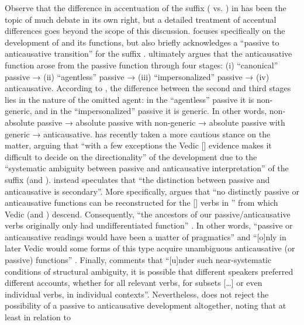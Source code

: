 Observe that the difference in accentuation of the suffix ( vs. ) in  has been the topic of much debate in its own right, but a detailed treatment of accentual differences goes beyond the scope of this discussion. \citet[246]{kulikov:2011b} focuses specifically on the development of  and its functions, but also briefly acknowledges a “passive to anticausative transition” for the suffix . \citet[248]{kulikov:2011b} ultimately argues that the anticausative function arose from the passive function through four stages: (i) “canonical” passive → (ii) “agentless” passive → (iii) “impersonalized” passive → (iv) anticausative. According to \citeauthor{kulikov:2011b}, the difference between the second and third stages lies in the nature of the omitted agent: in the “agentless” passive it is non-generic, and in the “impersonalized” passive it is generic. In other words, non-absolute passive → absolute passive with non-generic  → absolute passive with generic  → anticausative. \citet[182]{hock:2019} has recently taken a more cautious stance on the matter, arguing that “with a few exceptions the Vedic [] evidence makes it difficult to decide on the directionality” of the development due to the “systematic ambiguity between passive and anticausative interpretation” of the suffix  (and ). \citet[188]{hock:2019} instead speculates that “the distinction between passive and anticausative is secondary”. More specifically, \citet[188f.]{hock:2019} argues that “no distinctly passive or anticausative functions can be reconstructed for the [] verbs in ” from which Vedic   (and ) descend. Consequently, “the ancestors of our passive/anticausative verbs originally only had undifferentiated  function” \citep[189]{hock:2019}. In other words, “passive or anticausative readings would have been a matter of pragmatics” and “[o]nly in later Vedic would some forms of this type acquire unambiguous anticausative (or passive) functions” \citep[189]{hock:2019}. Finally, \citet[190]{hock:2019} comments that “[u]nder such near-systematic conditions of structural ambiguity, it is possible that different speakers preferred different accounts, whether for all relevant verbs, for subsets […] or even individual verbs, in individual contexts”. Nevertheless, \citeauthor{hock:2019} does not reject the possibility of a passive to anticausative development altogether, noting that at least in relation to 